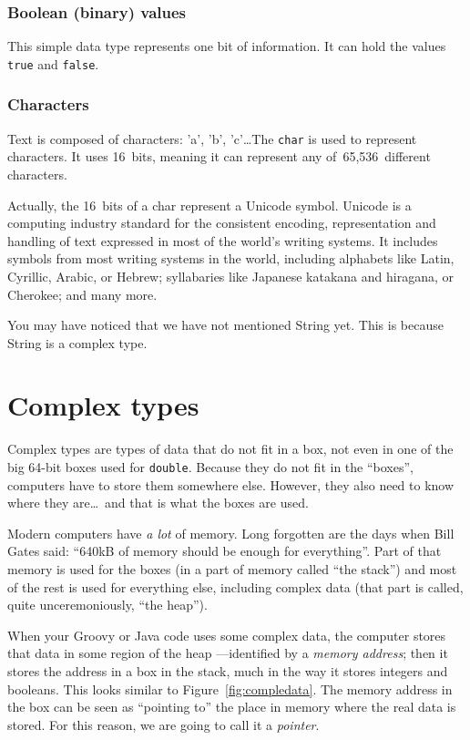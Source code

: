 \subsubsection{Boolean (binary) values}
\label{sec:bool-binary-valu}

This simple data type represents one bit of information. It can hold
the values \verb+true+ and \verb+false+. 

\subsubsection{Characters}
\label{sec:characters}

Text is composed of characters: 'a', 'b', 'c'\ldots The \verb+char+ is
used to represent characters. It uses 16~bits, meaning it can
represent any of~65,536~different characters. 

Actually, the 16~bits of a char represent a Unicode symbol. Unicode is
a computing industry standard for the consistent encoding,
representation and handling of text expressed in most of the world's
writing systems. It includes symbols from most writing systems in
the world, including alphabets like Latin, Cyrillic, Arabic, or
Hebrew; syllabaries like Japanese katakana and hiragana, or
Cherokee; and many more. 

You may have noticed that we have not mentioned String yet. This is
because String is a complex type. 

\section{Complex types}
\label{sec:complex-types}

Complex types are types of data that do not fit in a box, not even in
one of the big 64-bit boxes used for \verb+double+. Because they do
not fit in the ``boxes'', computers have to store them somewhere
else. However, they also need to know where they are\ldots~and that is
what the boxes are used. 

Modern computers have \emph{a lot} of memory. Long forgotten are the
days when Bill Gates said: ``640kB of memory should be enough for
everything''. Part of that memory is used for the boxes (in a part of
memory called ``the stack'') and most of the rest is used for
everything else, including complex data (that part is called, quite
unceremoniously, ``the heap''). 

When your Groovy or Java code uses some complex data, the computer
stores that data in some region of the heap ---identified by a \emph{memory
  address}; then it stores the address in a box in the stack, much in
the way it stores integers and booleans. This looks similar to
Figure~\ref{fig:compledata}. The memory address in the box can be seen
as ``pointing to'' the place in memory where the real data is
stored. For this reason, we are going to call it a \emph{pointer}. 

